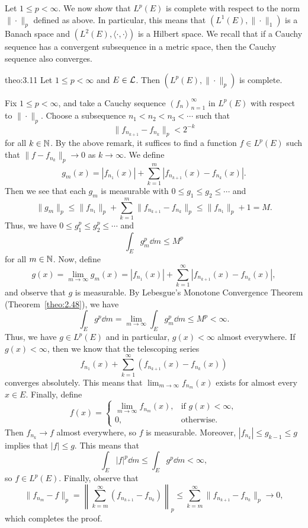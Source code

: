 Let $1 \leq p < \infty$. We now show that $L^p(E)$ is complete with 
respect to the norm $\|\cdot\|_p$ defined as above. In particular, 
this means that $(L^1(E), \|\cdot\|_1)$ is a Banach space and 
$(L^2(E), \langle \cdot, \cdot \rangle)$ is a Hilbert space. 
We recall that if a Cauchy sequence has a convergent subsequence in a 
metric space, then the Cauchy sequence also converges. 

\begin{theo}{theo:3.11}
    Let $1 \leq p < \infty$ and $E \in {\cal L}$. Then $(L^p(E), \|\cdot\|_p)$ 
    is complete. 
\end{theo}
\begin{pf}
    Fix $1 \leq p < \infty$, and take a Cauchy sequence $(f_n)_{n=1}^\infty$ 
    in $L^p(E)$ with respect to $\|\cdot\|_p$. Choose a subsequence 
    $n_1 < n_2 < n_3 < \cdots$ such that 
    \[ \|f_{n_{k+1}} - f_{n_k}\|_p < 2^{-k} \] 
    for all $k \in \mathbb{N}$. By the above remark, it suffices to find a function 
    $f \in L^p(E)$ such that $\|f - f_{n_k}\|_p \to 0$ as $k \to \infty$. 
    We define 
    \[ g_m(x) = |f_{n_1}(x)| + \sum_{k=1}^m |f_{n_{k+1}}(x) - f_{n_k}(x)|. \] 
    Then we see that each $g_m$ is measurable with $0 \leq g_1 
    \leq g_2 \leq \cdots$ and  
    \[ \|g_m\|_p \leq \|f_{n_1}\|_p + \sum_{k=1}^m \|f_{n_{k+1}} - 
    f_{n_k}\|_p \leq \|f_{n_1}\|_p + 1 = M. \]     
    Thus, we have $0 \leq g_1^p \leq g_2^p \leq \cdots$ and 
    \[ \int_E g_m^p \dd m \leq M^p \] 
    for all $m \in \mathbb{N}$. Now, define 
    \[ g(x) = \lim_{m\to\infty} g_m(x) = |f_{n_1}(x)| + 
    \sum_{k=1}^\infty |f_{n_{k+1}}(x) - f_{n_k}(x)|, \] 
    and observe that $g$ is measurable. By Lebesgue's Monotone Convergence 
    Theorem (Theorem~\ref{theo:2.48}), we have 
    \[ \int_E g^p\dd m = \lim_{m\to\infty} \int_E g_m^p\dd m \leq M^p 
    < \infty. \] 
    Thus, we have $g \in L^p(E)$ and in particular, $g(x) < \infty$ almost 
    everywhere. If $g(x) < \infty$, then we know that the telescoping series 
    \[ f_{n_1}(x) + \sum_{k=1}^\infty (f_{n_{k+1}}(x) - f_{n_k}(x)) \] 
    converges absolutely. This means that $\lim_{m\to\infty} f_{n_m}(x)$ 
    exists for almost every $x \in E$. Finally, define 
    \[ f(x) = \begin{cases}
        \lim_{m\to\infty} f_{n_m}(x), & \text{if } g(x) < \infty, \\ 
        0, & \text{otherwise.}
    \end{cases} \] 
    Then $f_{n_k} \to f$ almost everywhere, so $f$ is measurable. Moreover, 
    $|f_{n_k}| \leq g_{k-1} \leq g$ implies that $|f| \leq g$. This means that 
    \[ \int_E |f|^p \dd m \leq \int_E g^p \dd m < \infty, \] 
    so $f \in L^p(E)$. Finally, observe that 
    \[ \|f_{n_m} - f\|_p = \left\| \sum_{k=m}^\infty (f_{n_{k+1}} 
    - f_{n_k}) \right\|_p \leq \sum_{k=m}^\infty \|f_{n_{k+1}} - f_{n_k}\|_p 
    \to 0, \] 
    which completes the proof. 
\end{pf}
